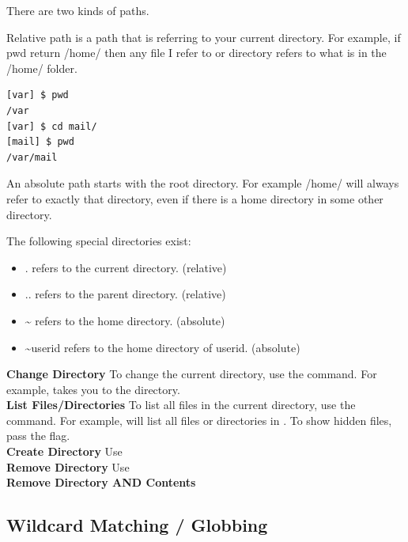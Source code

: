 \documentclass[english, 11pt]{article}
\begin{document}
  There are two kinds of paths.

  \begin{defn}
    Relative path is a path that is referring to your current directory. For example, if {\ttfamily pwd} return {\ttfamily /home/} then any file I refer to or directory refers to what is in the {\ttfamily /home/} folder.
    \begin{lstlisting}[language=bash,numbers=none]
[var] $ pwd
/var
[var] $ cd mail/
[mail] $ pwd
/var/mail
    \end{lstlisting}
  \end{defn}

  \begin{defn}
    An absolute path starts with the root directory. For example {\ttfamily /home/} will always refer to exactly that directory, even if there is a {\ttfamily home} directory in some other directory.
  \end{defn}

  \begin{rem}
    The following special directories exist:
    \begin{itemize}
      \item {\ttfamily .} refers to the current directory. (relative)
      \item {\ttfamily ..} refers to the parent directory. (relative)
      \item {\ttfamily \textasciitilde} refers to the home directory. (absolute)
      \item {\ttfamily \textasciitilde userid} refers to the home directory of {\ttfamily userid}. (absolute)
    \end{itemize}
  \end{rem}

  \textbf{Change Directory} To change the current directory, use the  command. For example,  takes you to the  directory. \\
  \textbf{List Files/Directories} To list all files in the current directory, use the  command. For example,  will list all files or directories in . To show hidden files, pass the  flag. \\
  \textbf{Create Directory} Use  \\
  \textbf{Remove Directory} Use  \\
  \textbf{Remove Directory AND Contents} 

  \subsection{Wildcard Matching / Globbing}
\end{document}
